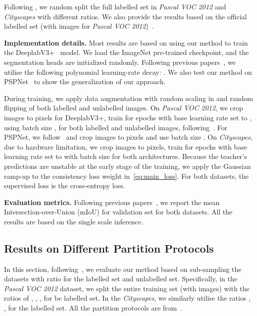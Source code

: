 \documentclass[10pt,twocolumn,letterpaper]{article}
\begin{document}
Following \cite{ke2020guided, chen2021semi}, we random split the full labelled set in \textit{Pascal VOC 2012} and \textit{Cityscapes} with different ratios. We also provide the results based on the official labelled set (with  images for \textit{Pascal VOC 2012})~\cite{zou2020pseudoseg, yuan2021simple}.

\textbf{Implementation details.}
Most results are based on using our method to train the DeeplabV3+~\cite{chen2017deeplab} model. We load the ImageNet pre-trained checkpoint, and the segmentation heads are initialized randomly. Following previous papers~\cite{ouali2020semi, he2021re, chen2021semi}, we utilise the following polynomial learning-rate decay: . We also test our method on PSPNet~\cite{ouali2020semi, lai2021semi} to show the generalization of our approach.


During training, we apply data augmentation with random scaling in  and random flipping of both labelled and unlabelled images. 
On \textit{Pascal VOC 2012}, we crop images to  pixels for DeeplabV3+, train for  epochs with base learning rate set to , using batch size ,
for both labelled and unlabelled images, following~\cite{chen2021semi}.
For PSPNet, we follow~\cite{he2021re} and crop images to  pixels and use batch size . 
On \textit{Cityscapes}, due to hardware limitation, we crop images to  pixels, train for  epochs with base learning rate set to  with batch size  for both architectures. Because the teacher's predictions are unstable at the early stage of the training, we apply the Gaussian ramp-up to the consistency loss weight  in~\eqref{eq:main_loss}. 
For both datasets, the supervised loss is the cross-entropy loss.







\textbf{Evaluation metrics.}  Following  previous papers~\cite{chen2021semi, ke2020guided}, we report the mean Intersection-over-Union (mIoU) for validation set 
for both datasets. All the results are based on the single scale inference. 


\subsection{Results on Different Partition Protocols}
\label{sec:4.2}
In this section, following~\cite{ke2020guided, chen2021semi}, we evaluate our method based on sub-sampling the datasets with ratio  for the labelled set and  unlabelled set. Specifically, in the \textit{Pascal VOC 2012} dataset, we split the entire training set (with  images) with the ratios of , , ,  for be labelled set. In the \textit{Cityscapes}, we similarly utilise the ratios , ,  for the labelled set. All the partition protocols are from~\cite{chen2021semi}. 
\end{document}
